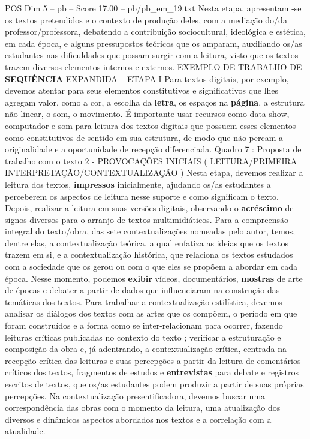 \begin{textsample}{POS Dim 5 – pb – Score 17.00 – pb/pb\_em\_19.txt}
Nesta etapa, apresentam -se os textos pretendidos e o contexto de produção deles, com a mediação do/da professor/professora, debatendo a contribuição sociocultural, ideológica e estética, em cada época, e alguns pressupostos teóricos que os amparam, auxiliando os/as estudantes nas dificuldades que possam surgir com a leitura, visto que os textos trazem diversos elementos internos e externos.
EXEMPLO DE TRABALHO DE \textbf{SEQUÊNCIA} EXPANDIDA – ETAPA I Para textos digitais, por exemplo, devemos atentar para seus elementos constitutivos e significativos que lhes agregam valor, como a cor, a escolha da \textbf{letra}, os espaços na \textbf{página}, a estrutura não linear, o som, o movimento.
É importante usar recursos como data show, computador e som para leitura dos textos digitais que possuem esses elementos como constitutivos de sentido em sua estrutura, de modo que não percam a originalidade e a oportunidade de recepção diferenciada.
Quadro 7 : Proposta de trabalho com o texto 2 - PROVOCAÇÕES INICIAIS ( LEITURA/PRIMEIRA INTERPRETAÇÃO/CONTEXTUALIZAÇÃO ) Nesta etapa, devemos realizar a leitura dos textos, \textbf{impressos} inicialmente, ajudando os/as estudantes a perceberem os aspectos de leitura nesse suporte e como significam o texto.
Depois, realizar a leitura em suas versões digitais, observando o \textbf{acréscimo} de signos diversos para o arranjo de textos multimidiáticos.
Para a compreensão integral do texto/obra, das sete contextualizações nomeadas pelo autor, temos, dentre elas, a contextualização teórica, a qual enfatiza as ideias que os textos trazem em si, e a contextualização histórica, que relaciona os textos estudados com a sociedade que os gerou ou com o que eles se propõem a abordar em cada época.
Nesse momento, podemos \textbf{exibir} vídeos, documentários, \textbf{mostras} de arte de épocas e debater a partir de dados que influenciaram na construção das temáticas dos textos.
Para trabalhar a contextualização estilística, devemos analisar os diálogos dos textos com as artes que os compõem, o período em que foram construídos e a forma como se inter-relacionam para ocorrer, fazendo leituras críticas publicadas no contexto do texto ; verificar a estruturação e composição da obra e, já adentrando, a contextualização crítica, centrada na recepção crítica das leituras e suas percepções a partir da leitura de comentários críticos dos textos, fragmentos de estudos e \textbf{entrevistas} para debate e registros escritos de textos, que os/as estudantes podem produzir a partir de suas próprias percepções.
Na contextualização presentificadora, devemos buscar uma correspondência das obras com o momento da leitura, uma atualização dos diversos e dinâmicos aspectos abordados nos textos e a correlação com a atualidade.

\end{textsample}
